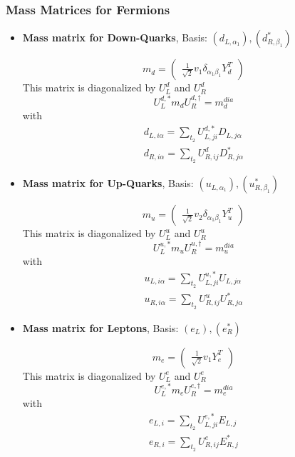 \subsubsection{Mass Matrices for Fermions}
\begin{itemize} 
\item {\bf Mass matrix for Down-Quarks}, Basis: \( \left(d_{L,{{\alpha_1}}}\right), \left(d^*_{R,{{\beta_1}}}\right) \) 
 
\begin{equation} 
m_{d} = \left( 
\begin{array}{c}
\frac{1}{\sqrt{2}} v_1 \delta_{{\alpha_1} {\beta_1}} Y_{d}^{T} \end{array} 
\right) 
 \end{equation} 
This matrix is diagonalized by \(U^d_L\) and \(U^d_R\) 
\begin{equation} 
U^{d,*}_L m_{d} U_{R}^{d,\dagger} = m^{dia}_{d} 
\end{equation} 
with 
\begin{align} 
d_{L,{i \alpha}} = \sum_{t_2}U^{d,*}_{L,{j i}}D_{L,{j \alpha}}\\ 
d_{R,{i \alpha}} = \sum_{t_2}U_{R,{i j}}^{d}D^*_{R,{j \alpha}}
\end{align} 
\item {\bf Mass matrix for Up-Quarks}, Basis: \( \left(u_{L,{{\alpha_1}}}\right), \left(u^*_{R,{{\beta_1}}}\right) \) 
 
\begin{equation} 
m_{u} = \left( 
\begin{array}{c}
\frac{1}{\sqrt{2}} v_2 \delta_{{\alpha_1} {\beta_1}} Y_{u}^{T} \end{array} 
\right) 
 \end{equation} 
This matrix is diagonalized by \(U^u_L\) and \(U^u_R\) 
\begin{equation} 
U^{u,*}_L m_{u} U_{R}^{u,\dagger} = m^{dia}_{u} 
\end{equation} 
with 
\begin{align} 
u_{L,{i \alpha}} = \sum_{t_2}U^{u,*}_{L,{j i}}U_{L,{j \alpha}}\\ 
u_{R,{i \alpha}} = \sum_{t_2}U_{R,{i j}}^{u}U^*_{R,{j \alpha}}
\end{align} 
\item {\bf Mass matrix for Leptons}, Basis: \( \left(e_L\right), \left(e_R^*\right) \) 
 
\begin{equation} 
m_{e} = \left( 
\begin{array}{c}
\frac{1}{\sqrt{2}} v_1 Y_{e}^{T} \end{array} 
\right) 
 \end{equation} 
This matrix is diagonalized by \(U^e_L\) and \(U^e_R\) 
\begin{equation} 
U^{e,*}_L m_{e} U_{R}^{e,\dagger} = m^{dia}_{e} 
\end{equation} 
with 
\begin{align} 
e_{L,{i}} = \sum_{t_2}U^{e,*}_{L,{j i}}E_{L,{j}}\\ 
e_{R,{i}} = \sum_{t_2}U_{R,{i j}}^{e}E^*_{R,{j}}
\end{align} 
\end{itemize} 
